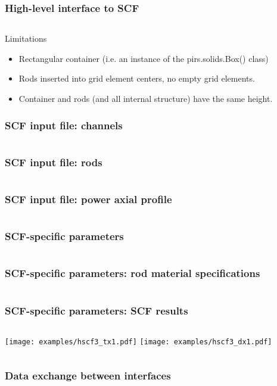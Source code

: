 \begin{frame}[fragile]
    \frametitle{High-level interface to SCF}
    \inputminted[frame=single,fontfamily=tt,fontsize=\footnotesize]{python}{examples/hscf1.py}

    \begin{block}{Limitations}
        \begin{itemize}
            \item Rectangular container (i.e. an instance of the pirs.solids.Box() class)
            \item Rods inserted into grid element centers, no empty grid elements.
            \item Container and rods (and all internal structure) have the same height.
        \end{itemize}
    \end{block}
\end{frame}

\begin{frame}[fragile]
    \frametitle{SCF input file: channels}
    \inputminted[frame=single,fontfamily=tt,fontsize=\tiny,firstline=92,lastline=117]{rst}{examples/s1_0/input.txt}
\end{frame}

\begin{frame}[fragile]
    \frametitle{SCF input file: rods}
    \inputminted[frame=single,fontfamily=tt,fontsize=\tiny,firstline=152,lastline=166]{rst}{examples/s1_0/input.txt}
\end{frame}

\begin{frame}[fragile]
    \frametitle{SCF input file: power axial profile}
    \inputminted[frame=single,fontfamily=tt,fontsize=\tiny,firstline=343,lastline=362]{rst}{examples/s1_0/input.txt}
\end{frame}

\begin{frame}[fragile]
    \frametitle{SCF-specific parameters}
    \inputminted[frame=single,fontfamily=tt,fontsize=\tiny]{python}{examples/hscf2.py}
\end{frame}


\begin{frame}[fragile]
    \frametitle{SCF-specific parameters: rod material specifications}
    \inputminted[frame=single,fontfamily=tt,fontsize=\tiny]{python}{examples/hscf3.py}
\end{frame}

\begin{frame}[fragile]
    \frametitle{SCF-specific parameters: SCF results}
    \begin{columns}
        \texttt{[image: examples/hscf3\_tx1.pdf]}
        \texttt{[image: examples/hscf3\_dx1.pdf]}
    \end{columns}
\end{frame}


\begin{frame}[fragile]
    \frametitle{Data exchange between interfaces}
    \inputminted[frame=single,fontfamily=tt,fontsize=\tiny,lastline=27]{python}{examples/coupling.py}
\end{frame}


